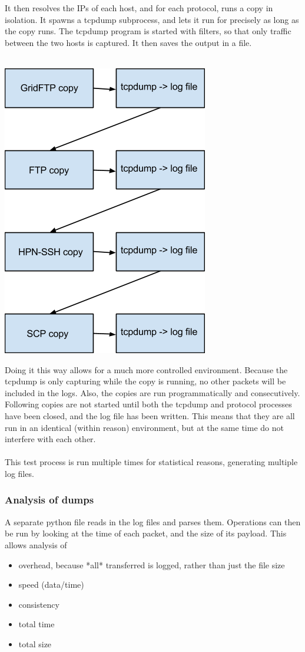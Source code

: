 \documentclass{sig-alternate-05-2015}
\begin{document}
It then resolves the IPs of each host, and for each protocol, runs a copy in isolation. It spawns a tcpdump subprocess, and lets it run for precisely as long as the copy runs. The tcpdump program is started with filters, so that only traffic between the two hosts is captured. It then saves the output in a file.\\\\
\begin{center}
	\includegraphics[height=0.5\textheight]{img/seq_example}
\end{center}
Doing it this way allows for a much more controlled environment. Because the tcpdump is only capturing while the copy is running, no other packets will be included in the logs. Also, the copies are run programmatically and consecutively. Following copies are not started until both the tcpdump and protocol processes have been closed, and the log file has been written. This means that they are all run in an identical (within reason) environment, but at the same time do not interfere with each other.\\\\

This test process is run multiple times for statistical reasons, generating multiple log files.

\subsubsection{Analysis of dumps}
A separate python file reads in the log files and parses them. Operations can then be run by looking at the time of each packet, and the size of its payload. This allows analysis of
\begin{itemize}
	\item overhead, because *all* transferred is logged, rather than just the file size
	\item speed (data/time)
	\item consistency
	\item total time
	\item total size
\end{itemize}
\end{document}

